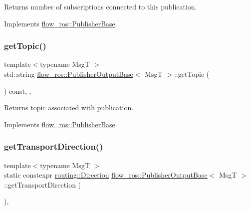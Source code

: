 Returns number of subscriptions connected to this publication. 



Implements \hyperlink{classflow__ros_1_1_publisher_base_ae5638184ee60bbc1326a5e7b47919bec}{flow\+\_\+ros\+::\+Publisher\+Base}.

\mbox{\label{classflow__ros_1_1_publisher_output_base_a28d4636b7d52e0dac54f27556308e9d4}} 
\subsubsection{\texorpdfstring{get\+Topic()}{getTopic()}}
{\footnotesize\ttfamily template$<$typename MsgT $>$ \\
std\+::string \hyperlink{classflow__ros_1_1_publisher_output_base}{flow\+\_\+ros\+::\+Publisher\+Output\+Base}$<$ MsgT $>$\+::get\+Topic (\begin{DoxyParamCaption}{ }\end{DoxyParamCaption}) const\hspace{0.3cm}{\ttfamily [inline]}, {\ttfamily [final]}, {\ttfamily [virtual]}}



Returns topic associated with publication. 



Implements \hyperlink{classflow__ros_1_1_publisher_base_aed36dfd3c58ff3c588b2030319cd26e1}{flow\+\_\+ros\+::\+Publisher\+Base}.

\mbox{\label{classflow__ros_1_1_publisher_output_base_a4f42e2bf09aa92117879071652a0df17}} 
\subsubsection{\texorpdfstring{get\+Transport\+Direction()}{getTransportDirection()}}
{\footnotesize\ttfamily template$<$typename MsgT $>$ \\
static constexpr \hyperlink{transport__info_8h_acb4b6ac875de32a0d0ee8cec235f7752}{routing\+::\+Direction} \hyperlink{classflow__ros_1_1_publisher_output_base}{flow\+\_\+ros\+::\+Publisher\+Output\+Base}$<$ MsgT $>$\+::get\+Transport\+Direction (\begin{DoxyParamCaption}{ }\end{DoxyParamCaption})\hspace{0.3cm}{\ttfamily [inline]}, {\ttfamily [static]}}



